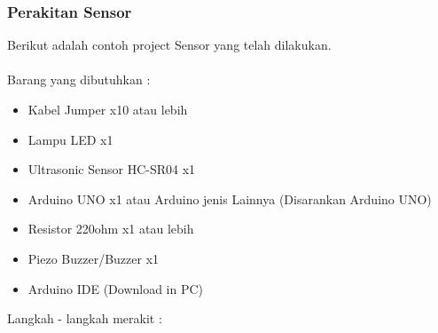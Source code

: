 \documentclass{article}
\begin{document}
\subsubsection{Perakitan Sensor}
Berikut adalah contoh project Sensor yang telah dilakukan.\\\\ Barang yang dibutuhkan : 
\begin{itemize}
	\item Kabel Jumper x10 atau lebih
	\item Lampu LED x1
	\item Ultrasonic Sensor HC-SR04 x1
	\item Arduino UNO x1 atau Arduino jenis Lainnya (Disarankan Arduino UNO)
	\item Resistor 220ohm x1 atau lebih
	\item Piezo Buzzer/Buzzer x1
	\item Arduino IDE (Download in PC)
\end{itemize}
Langkah - langkah merakit : 
\end{document}
